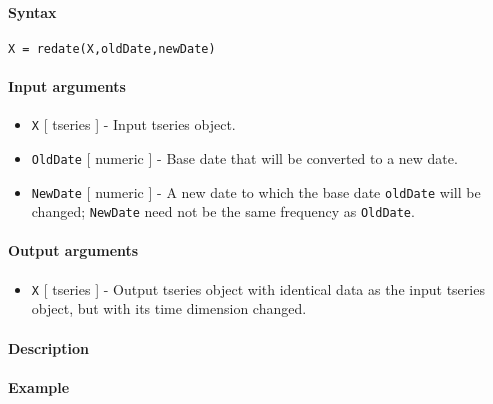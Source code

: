 


	\paragraph{Syntax}

\begin{verbatim}
X = redate(X,oldDate,newDate)
\end{verbatim}

\paragraph{Input arguments}

\begin{itemize}
\item
  \texttt{X} {[} tseries {]} - Input tseries object.
\item
  \texttt{OldDate} {[} numeric {]} - Base date that will be converted to
  a new date.
\item
  \texttt{NewDate} {[} numeric {]} - A new date to which the base date
  \texttt{oldDate} will be changed; \texttt{NewDate} need not be the
  same frequency as \texttt{OldDate}.
\end{itemize}

\paragraph{Output arguments}

\begin{itemize}
\itemsep1pt\parskip0pt
\item
  \texttt{X} {[} tseries {]} - Output tseries object with identical data
  as the input tseries object, but with its time dimension changed.
\end{itemize}

\paragraph{Description}

\paragraph{Example}


